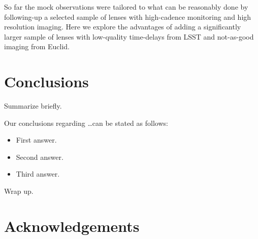 \documentclass[useAMS,usenatbib]{mn2e}
\begin{document}
So far the mock observations were tailored to what can be reasonably done by following-up a selected sample of lenses with high-cadence monitoring and high resolution imaging.
Here we explore the advantages of adding a significantly larger sample of lenses with low-quality time-delays from LSST and not-as-good imaging from Euclid.





\section{Conclusions}
\label{sec:conclude}

Summarize briefly.

Our conclusions regarding \ldots can be stated as follows:

\begin{itemize}

\item First answer.

\item Second answer.

\item Third answer.

\end{itemize}

Wrap up.



\section*{Acknowledgements}






\label{lastpage}
\bsp
\end{document}
